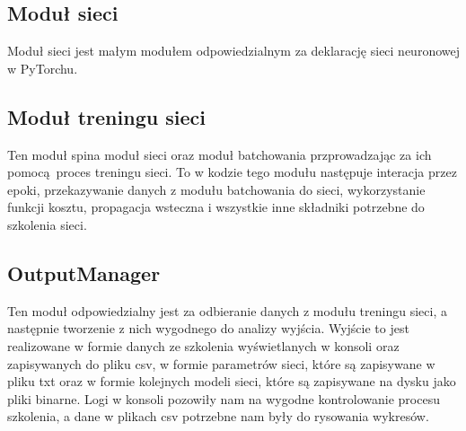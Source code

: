 \subsection{Moduł sieci} 
Moduł sieci jest małym modułem odpowiedzialnym za deklarację sieci neuronowej w PyTorchu.
 
\subsection{Moduł treningu sieci}
Ten moduł spina moduł sieci oraz moduł batchowania przprowadzając za ich pomocą proces treningu sieci.
To w kodzie tego modułu następuje interacja przez epoki, przekazywanie danych z modułu batchowania 
do sieci, wykorzystanie funkcji kosztu, propagacja wsteczna i wszystkie inne składniki potrzebne do 
szkolenia sieci. 

\subsection{OutputManager}
Ten moduł odpowiedzialny jest za odbieranie danych z modułu treningu sieci, a następnie tworzenie z nich
wygodnego do analizy wyjścia. Wyjście to jest realizowane w formie danych ze szkolenia wyświetlanych 
w konsoli oraz zapisywanych do pliku csv, w formie parametrów sieci, które są zapisywane
w pliku txt oraz w formie kolejnych modeli sieci, które są zapisywane na dysku jako pliki binarne.
Logi w konsoli pozowiły nam na wygodne kontrolowanie procesu szkolenia, a dane w plikach csv potrzebne 
nam były do rysowania wykresów.

\newpage
